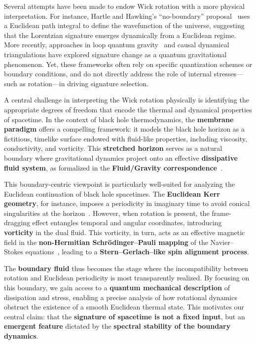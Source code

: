 \documentclass[11pt]{article}
\begin{document}
Several attempts have been made to endow Wick rotation with a more physical interpretation. For instance, Hartle and Hawking's ``no-boundary'' proposal~\cite{HartleHawking1983} uses a Euclidean path integral to define the wavefunction of the universe, suggesting that the Lorentzian signature emerges dynamically from a Euclidean regime. More recently, approaches in loop quantum gravity~\cite{BojowaladBrahma2016} and causal dynamical triangulations have explored signature change as a quantum gravitational phenomenon. Yet, these frameworks often rely on specific quantization schemes or boundary conditions, and do not directly address the role of internal stresses---such as rotation---in driving signature selection.

A central challenge in interpreting the Wick rotation physically is identifying the appropriate degrees of freedom that encode the thermal and dynamical properties of spacetime. In the context of black hole thermodynamics, the \textbf{membrane paradigm} offers a compelling framework: it models the black hole horizon as a fictitious, timelike surface endowed with fluid-like properties, including viscosity, conductivity, and vorticity. This \textbf{stretched horizon} serves as a natural boundary where gravitational dynamics project onto an effective \textbf{dissipative fluid system}, as formalized in the \textbf{Fluid/Gravity correspondence}~\cite{FluidGravity2005}.

This boundary-centric viewpoint is particularly well-suited for analyzing the Euclidean continuation of black hole spacetimes. The \textbf{Euclidean Kerr geometry}, for instance, imposes a periodicity in imaginary time to avoid conical singularities at the horizon~\cite{GibbonsHawking1977}. However, when rotation is present, the frame-dragging effect entangles temporal and angular coordinates, introducing \textbf{vorticity} in the dual fluid. This vorticity, in turn, acts as an effective magnetic field in the \textbf{non-Hermitian Schr\"odinger--Pauli mapping} of the Navier--Stokes equations~\cite{MengYang2024}, leading to a \textbf{Stern--Gerlach--like spin alignment process}.

The \textbf{boundary fluid} thus becomes the stage where the incompatibility between rotation and Euclidean periodicity is most transparently realized. By focusing on this boundary, we gain access to a \textbf{quantum mechanical description} of dissipation and stress, enabling a precise analysis of how rotational dynamics obstruct the existence of a smooth Euclidean thermal state. This motivates our central claim: that the \textbf{signature of spacetime is not a fixed input}, but an \textbf{emergent feature} dictated by the \textbf{spectral stability of the boundary dynamics}.
\end{document}
